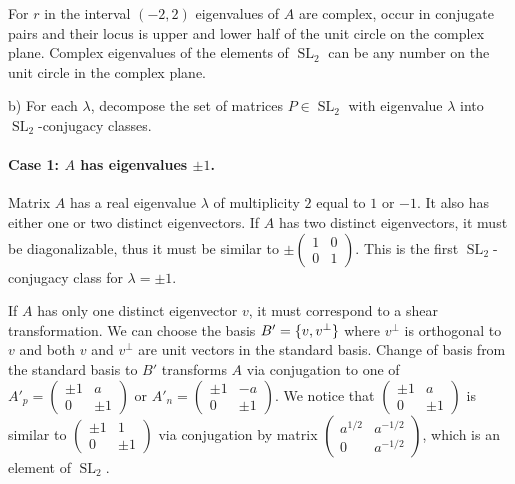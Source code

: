 \documentclass{article}
\theoremstyle{definition}
\newcommand{\SL}{\operatorname{SL}}
\DeclarePairedDelimiter\set{\{}{\}}
\begin{document}
For $r$ in the interval $(-2, 2)$ eigenvalues of $A$ are complex, occur in conjugate pairs and their locus is upper and lower half of the unit circle on the complex plane.
Complex eigenvalues of the elements of $\SL_2$ can be any number on the unit circle in the complex plane.


\begin{tcolorbox}
b) For each $\lambda$, decompose the set of matrices $P \in \SL_2$ with eigenvalue $\lambda$ into $\SL_2$-conjugacy classes.
\end{tcolorbox}

\paragraph{Case 1: $A$ has eigenvalues $\pm 1$.}
Matrix $A$ has a real eigenvalue $\lambda$ of multiplicity $2$ equal to $1$ or $-1$.
It also has either one or two distinct eigenvectors.
If $A$ has two distinct eigenvectors, it must be diagonalizable, thus it must be similar to
$
\pm
\begin{pmatrix}
    1 & 0 \\
    0 & 1
\end{pmatrix}
$.
This is the first $\SL_2$-conjugacy class for $\lambda = \pm 1$.

If $A$ has only one distinct eigenvector $v$, it must correspond to a shear transformation.
We can choose the basis $B' = \set{v,v^\perp}$ where $v^\perp$ is orthogonal to $v$ and both $v$ and $v^\perp$ are unit vectors in the standard basis.
Change of basis from the standard basis to $B'$ transforms $A$ via conjugation to one of
$
    A'_p =
    \begin{pmatrix}
        \pm 1 & a \\
        0 & \pm 1
    \end{pmatrix}
$
or
$
    A'_n =
    \begin{pmatrix}
        \pm 1 & -a \\
        0 & \pm 1
    \end{pmatrix}
$.
We notice that 
$
    \begin{pmatrix}
        \pm 1 & a \\
        0 & \pm 1
    \end{pmatrix}
$
is similar to
$
    \begin{pmatrix}
        \pm 1 & 1 \\
        0 & \pm 1
    \end{pmatrix}
$
via conjugation by matrix
$
    \begin{pmatrix}
        a^{1/2} & a^{-1/2} \\
        0 & a^{-1/2}
    \end{pmatrix}
$,
which is an element of $\SL_2$.
\end{document}
